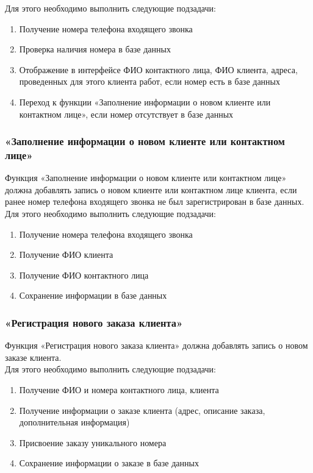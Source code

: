 \documentclass[a4paper,12pt]{article}
\begin{document}
Для этого необходимо выполнить следующие подзадачи:
\begin{enumerate}
    \item Получение номера телефона входящего звонка
    \item Проверка наличия номера в базе данных
    \item Отображение в интерфейсе ФИО контактного лица, ФИО клиента, адреса, проведенных для этого клиента работ, если номер есть в базе данных
    \item Переход к функции «Заполнение информации о новом клиенте или контактном лице», если номер отсутствует в базе данных
\end{enumerate}

\subsubsection{«Заполнение информации о новом клиенте или контактном лице»}
Функция «Заполнение информации о новом клиенте или контактном лице» должна добавлять запись о новом клиенте или контактном лице клиента, если ранее номер телефона входящего звонка не был зарегистрирован в базе данных.\\

Для этого необходимо выполнить следующие подзадачи:
\begin{enumerate}
    \item Получение номера телефона входящего звонка
    \item Получение ФИО клиента
    \item Получение ФИО контактного лица
    \item Сохранение информации в базе данных
\end{enumerate}

\subsubsection{«Регистрация нового заказа клиента»}
Функция «Регистрация нового заказа клиента» должна добавлять запись о новом заказе клиента.\\

Для этого необходимо выполнить следующие подзадачи:
\begin{enumerate}
    \item Получение ФИО и номера контактного лица, клиента
    \item Получение информации о заказе клиента (адрес, описание заказа, дополнительная информация)
    \item Присвоение заказу уникального номера
    \item Сохранение информации о заказе в базе данных
\end{enumerate}
\end{document}
